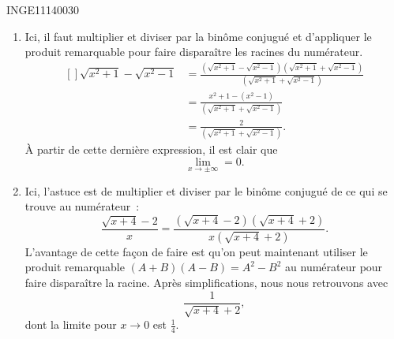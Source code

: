 

\begin{corrige}{INGE11140030}

	\begin{enumerate}

		\item
			Ici, il faut multiplier et diviser par la binôme conjugué et d'appliquer le produit remarquable pour faire disparaître les racines du numérateur.
			\begin{equation}
				\begin{aligned}[]
					\sqrt{x^2+1}-\sqrt{x^2-1}	&=		\frac{ \left(\sqrt{x^2+1}-\sqrt{x^2-1}\right) \left(\sqrt{x^2+1}+\sqrt{x^2-1}\right)  }{  \left(\sqrt{x^2+1}+\sqrt{x^2-1}\right)  }\\
					&=\frac{ x^2+1-(x^2-1) }{  \left(\sqrt{x^2+1}+\sqrt{x^2-1}\right)  }\\
					&=\frac{ 2 }{  \left(\sqrt{x^2+1}+\sqrt{x^2-1}\right)  }.
				\end{aligned}
			\end{equation}
			À partir de cette dernière expression, il est clair que
			\begin{equation}
				\lim_{x\to \pm\infty} =0.
			\end{equation}

		\item
			Ici, l'astuce est de multiplier et diviser par le binôme conjugué de ce qui se trouve au numérateur~:
			\begin{equation}
				\frac{ \sqrt{x+4}-2 }{ x }= \frac{ \left( \sqrt{x+4}-2 \right)\left( \sqrt{x+4}+2 \right)}{ x\left( \sqrt{x+4}+2 \right) }.
			\end{equation}
			L'avantage de cette façon de faire est qu'on peut maintenant utiliser le produit remarquable $(A+B)(A-B)=A^2-B^2$ au numérateur pour faire disparaître la racine. Après simplifications, nous nous retrouvons  avec
			\begin{equation}
				\frac{1}{ \sqrt{x+4}+2 },
			\end{equation}
			dont la limite pour $x\to 0$ est $\frac{1}{ 4 }$.

	\end{enumerate}

\end{corrige}
